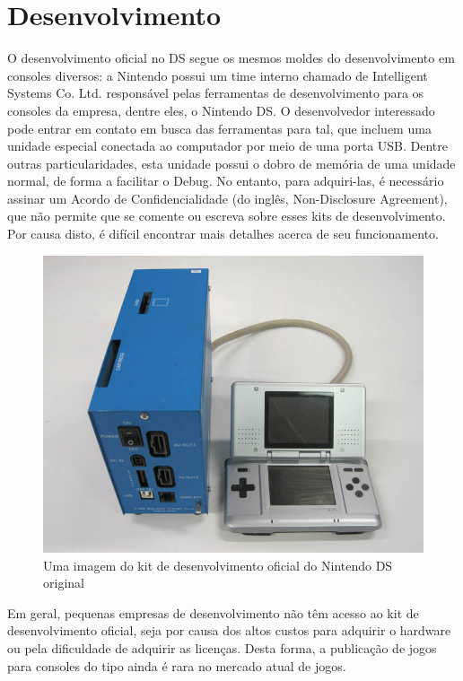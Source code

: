 \documentclass[brazil]{abnt}
\begin{document}
\section{Desenvolvimento}

O desenvolvimento oficial no DS segue os mesmos moldes do desenvolvimento em consoles diversos: a Nintendo possui um time interno chamado de Intelligent Systems Co. Ltd. responsável pelas ferramentas de desenvolvimento para os consoles da empresa, dentre eles, o Nintendo DS. O desenvolvedor interessado pode entrar em contato em busca das ferramentas para tal, que incluem uma unidade especial conectada ao computador por meio de uma porta USB. Dentre outras particularidades, esta unidade possui o dobro de memória de uma unidade normal, de forma a facilitar o Debug. No entanto, para adquiri-las, é necessário assinar um Acordo de Confidencialidade (do inglês, Non-Disclosure Agreement), que não permite que se comente ou escreva sobre esses kits de desenvolvimento. Por causa disto, é difícil encontrar mais detalhes acerca de seu funcionamento.

\begin{figure}
\centering
\includegraphics{imgs/is_devkit1.jpg}
\caption{Uma imagem do kit de desenvolvimento oficial do Nintendo DS original} 
\end{figure}

Em geral, pequenas empresas de desenvolvimento não têm acesso ao kit de desenvolvimento oficial, seja por causa dos altos custos para adquirir o hardware ou pela dificuldade de adquirir as licenças. Desta forma, a publicação de jogos para consoles do tipo ainda é rara no mercado atual de jogos.
\end{document}
